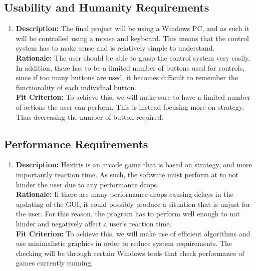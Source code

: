 \documentclass[12pt, titlepage]{article}
\begin{document}
\subsection{Usability and Humanity Requirements}
\begin{enumerate}[label=UH\arabic*]
  \item \textbf{Description:} The final project will be using a Windows PC, and as such it will be controlled using a mouse and keyboard. This means that the control system has to make sense and is relatively simple to understand.\\
\textbf{Rationale:} The user should be able to grasp the control system very easily. In addition, there has to be a limited number of buttons used for controls, since if too many buttons are used, it becomes difficult to remember the functionality of each individual button.\\
\textbf{Fit Criterion:} To achieve this, we will make sure to have a limited number of actions the user can perform. This is instead focusing more on strategy. Thus decreasing the number of button required.

\end{enumerate}

\subsection{Performance Requirements}
\begin{enumerate}[label=P\arabic*]
\item \textbf{Description:} Hextris is an arcade game that is based on strategy, and more importantly reaction time. As such, the software must perform at \textgamma \space to not hinder the user due to any performance drops.\\
\textbf{Rationale:} If there are many performance drops causing delays in the updating of the GUI, it could possibly produce a situation that is unjust for the user. For this reason, the program has to perform well enough to not hinder and negatively affect a user's reaction time.\\
\textbf{Fit Criterion:} To achieve this, we  will make use of efficient algorithms and use minimalistic graphics in order to reduce system requirements. The checking will be through certain Windows tools that check performance of games currently running. 

\end{enumerate}
\end{document}
